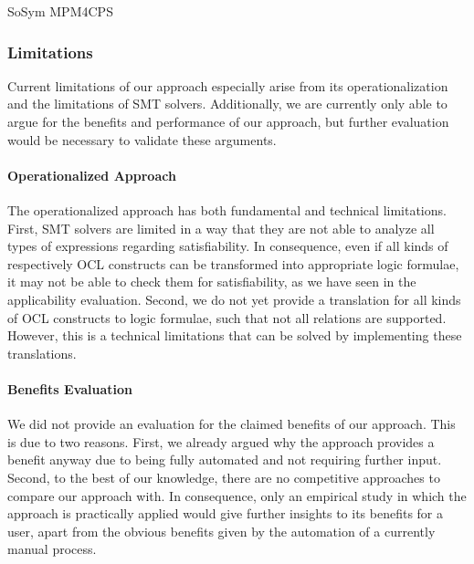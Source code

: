 \begin{copiedFrom}{SoSym MPM4CPS}




\subsubsection{Limitations}
\label{sec:evaluation:limitations}

Current limitations of our approach especially arise from its operationalization and the limitations of SMT solvers.
Additionally, we are currently only able to argue for the benefits and performance of our approach, but further evaluation would be necessary to validate these arguments.

\paragraph{Operationalized Approach}
The operationalized approach has both fundamental and technical limitations.
First, SMT solvers are limited in a way that they are not able to analyze all types of expressions regarding satisfiability.
In consequence, even if all kinds of \qvtr respectively OCL constructs can be transformed into appropriate logic formulae, it may not be able to check them for satisfiability, as we have seen in the applicability evaluation.
Second, we do not yet provide a translation for all kinds of OCL constructs to logic formulae, such that not all \qvtr relations are supported.
However, this is a technical limitations that can be solved by implementing these translations.

\paragraph{Benefits Evaluation}
We did not provide an evaluation for the claimed benefits of our approach.
This is due to two reasons.
First, we already argued why the approach provides a benefit anyway due to being fully automated and not requiring further input.
Second, to the best of our knowledge, there are no competitive approaches to compare our approach with.
In consequence, only an empirical study in which the approach is practically applied would give further insights to its benefits for a user, apart from the obvious benefits given by the automation of a currently manual process.


\end{copiedFrom}
